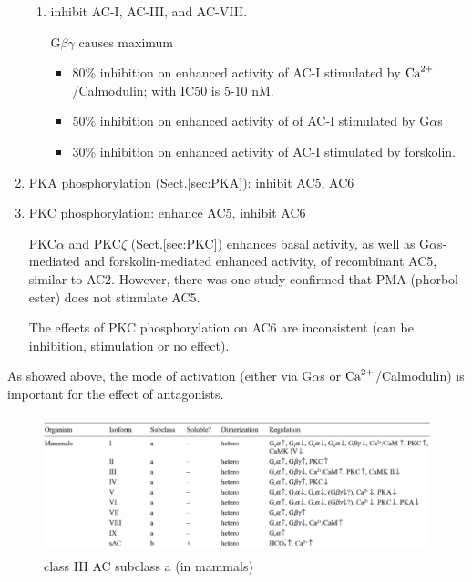 \begin{enumerate}
\begin{enumerate}
    \item inhibit AC-I, AC-III, and AC-VIII.
    
G$\beta\gamma$ causes maximum 
\begin{itemize}
  \item 80\% inhibition on enhanced activity of AC-I
stimulated by ${\text{Ca}^{2+}}$/Calmodulin; with IC50 is 5-10 nM.

  \item 50\% inhibition on enhanced activity of of AC-I stimulated by G$\alpha$s
  
  \item 30\% inhibition on enhanced activity of AC-I stimulated by forskolin.
\end{itemize}

  \end{enumerate}
  
  
  \item PKA phosphorylation (Sect.\ref{sec:PKA}):  inhibit AC5, AC6
  
  
  \item PKC phosphorylation: enhance AC5, inhibit AC6
  
PKC$\alpha$ and PKC$\zeta$ (Sect.\ref{sec:PKC}) enhances basal activity, 
as well as G$\alpha$s-mediated and forskolin-mediated enhanced activity, of
recombinant AC5, similar to AC2. However, there was one study confirmed that PMA
(phorbol ester) does not stimulate AC5. 

The effects of PKC phosphorylation on AC6 are inconsistent (can be inhibition,
stimulation or no effect). 


\end{enumerate}

As showed above, the mode of activation (either via G$\alpha$s or
${\text{Ca}^{2+}}$/Calmodulin) is important for the effect of antagonists.

\begin{figure}[hbt]
  \centerline{\includegraphics[height=4cm,
    angle=0]{./images/AC-III-a.eps}}
\caption{class III AC subclass a (in mammals)}
\label{fig:AC-III-a}
\end{figure}

